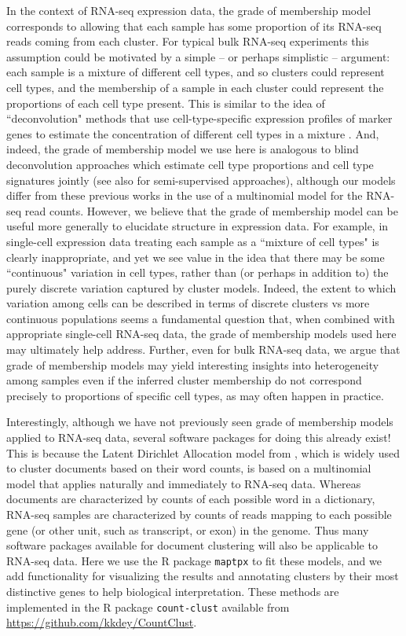 In the context of RNA-seq expression data, the grade of membership model corresponds to allowing that each
 sample has some proportion of its RNA-seq reads coming from each cluster. For typical bulk RNA-seq experiments this assumption 
could be motivated by a simple -- or perhaps simplistic -- argument: each sample is a mixture of different cell types, and so clusters 
could represent cell types, and the membership of a sample in each cluster could represent the proportions of each cell type present.
This is similar to the idea of ``deconvolution" methods that use cell-type-specific expression profiles of marker genes to estimate the concentration of different cell types in a mixture \cite{Lindsay2013}. And, indeed, the grade of membership model we use here is analogous to blind deconvolution approaches \cite{Schwartz2010,Repsilber2010}
 which estimate cell type proportions and cell type signatures jointly (see also \cite{Shen-Orr2010,Qiao2012} for semi-supervised approaches), although 
 our models differ from these previous works in the use of a multinomial model for the RNA-seq read counts. 
However, we believe that the grade of membership model can be useful more generally to elucidate structure in expression data.
For example, in single-cell expression data treating each sample as a ``mixture of cell types" is clearly inappropriate, and yet we see value in the idea
that there may be some ``continuous" variation in cell types, rather than (or perhaps in addition to) the purely discrete variation captured by cluster models. 
Indeed, the extent to which variation among cells can be described in terms of discrete clusters vs more continuous populations
seems a fundamental question that, when combined with appropriate single-cell RNA-seq data, the grade of membership models used here may
ultimately help address. Further, even for bulk RNA-seq data, we argue that grade of membership models may yield interesting insights into heterogeneity among samples
even if the inferred cluster membership do not correspond precisely to proportions of specific cell types, as may often happen in practice.

Interestingly, although we have not previously seen grade of membership models applied to RNA-seq data, several software packages
for doing this already exist! This is because the 
Latent Dirichlet Allocation model from \cite{Blei2003}, which is widely used to cluster documents based on their word counts, is based on a multinomial model that applies naturally and immediately to RNA-seq data. 
Whereas documents are characterized by counts of each possible word in a dictionary, RNA-seq samples
are characterized by counts of reads mapping to each possible gene (or other unit, such as transcript, or exon) in the genome. 
Thus many software packages available for document clustering will also be applicable to RNA-seq data.
Here we use the R package {\tt maptpx} \cite{Taddy2012} to fit these models, and we add functionality for visualizing the results and annotating
clusters by their most distinctive genes to help biological interpretation. These methods are implemented in the R package {\tt count-clust} available
from \url{https://github.com/kkdey/CountClust}.  



